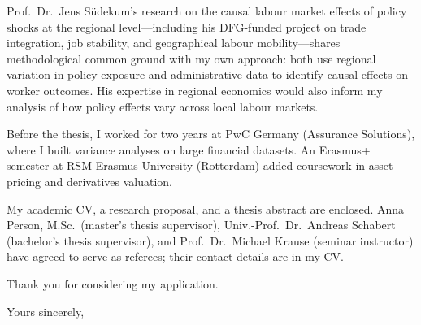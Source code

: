 \documentclass[a4paper,11pt]{letter}
\begin{document}
\begin{letter}
Prof.\ Dr.\ Jens S\"udekum's research on the causal labour market effects of policy shocks at the regional level---including his DFG-funded project on trade integration, job stability, and geographical labour mobility---shares methodological common ground with my own approach: both use regional variation in policy exposure and administrative data to identify causal effects on worker outcomes. His expertise in regional economics would also inform my analysis of how policy effects vary across local labour markets.

Before the thesis, I worked for two years at PwC Germany (Assurance Solutions), where I built variance analyses on large financial datasets. An Erasmus+ semester at RSM Erasmus University (Rotterdam) added coursework in asset pricing and derivatives valuation.

My academic CV, a research proposal, and a thesis abstract are enclosed. Anna Person, M.Sc.\ (master's thesis supervisor), Univ.-Prof.\ Dr.\ Andreas Schabert (bachelor's thesis supervisor), and Prof.\ Dr.\ Michael Krause (seminar instructor) have agreed to serve as referees; their contact details are in my CV.

Thank you for considering my application.

\closing{Yours sincerely,}

\end{letter}
\end{document}
